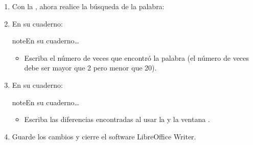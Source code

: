 \documentclass[letterpaper,10pt,spanish]{sphinxmanual}
\begin{document}
\begin{enumerate}
\begin{itemize}
\item {} 
\sphinxAtStartPar
En el campo , ESCRIBA la palabra: 

\item {} 
\sphinxAtStartPar
PULSE el botón: 

\item {} 
\sphinxAtStartPar
Realice una  que muestre  y guarde la imagen en la  del periodo actual con el nombre: 

\item {} 
\sphinxAtStartPar
CIERRE la ventana de 

\end{itemize}

\item {} 
\sphinxAtStartPar
Con la , ahora realice la búsqueda de la palabra: 

\item {} 
\sphinxAtStartPar
En su cuaderno:

\begin{sphinxadmonition}{note}{En su cuaderno…}
\begin{itemize}
\item {} 
\sphinxAtStartPar
Escriba el número de veces que  encontró la palabra  (el número de veces debe ser mayor que 2 pero menor que 20).

\end{itemize}
\end{sphinxadmonition}

\item {} 
\sphinxAtStartPar
En su cuaderno:

\begin{sphinxadmonition}{note}{En su cuaderno…}
\begin{itemize}
\item {} 
\sphinxAtStartPar
Escriba las diferencias encontradas al usar la  y la ventana .

\end{itemize}
\end{sphinxadmonition}

\item {} 
\sphinxAtStartPar
Guarde los cambios y cierre el software LibreOffice Writer.

\end{enumerate}
\end{document}
